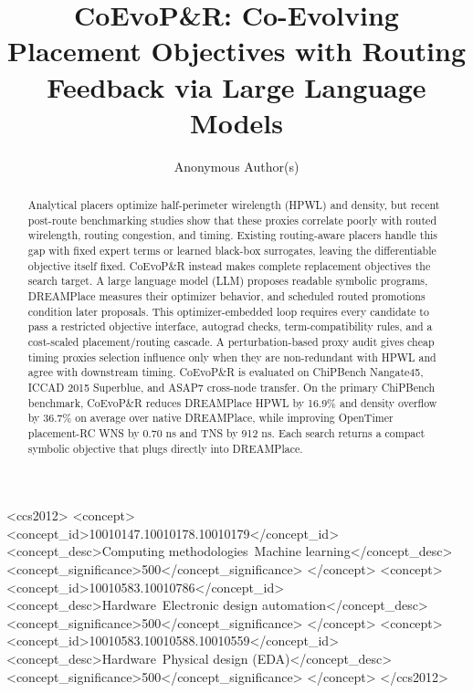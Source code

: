 \documentclass[sigconf,anonymous,review]{acmart}
\begin{document}
\title{CoEvoP\&R: Co-Evolving Placement Objectives with Routing Feedback via Large Language Models}

\author{Anonymous Author(s)}

\renewcommand{\shortauthors}{Anonymous}

\begin{abstract}
Analytical placers optimize half-perimeter wirelength (HPWL) and density, but
recent post-route benchmarking studies show that these proxies correlate poorly with
routed wirelength, routing congestion, and timing. Existing routing-aware placers
handle this gap with fixed expert terms or learned black-box surrogates, leaving
the differentiable objective itself fixed. CoEvoP\&R instead makes complete
replacement objectives the search target. A large language model (LLM)
proposes readable symbolic programs, DREAMPlace measures their optimizer
behavior, and scheduled routed promotions condition later proposals.
This optimizer-embedded loop requires every candidate to pass a restricted
objective interface, autograd checks, term-compatibility rules, and a
cost-scaled placement/routing cascade. A perturbation-based proxy audit gives
cheap timing proxies selection influence only when they are non-redundant with
HPWL and agree with downstream timing. CoEvoP\&R is evaluated on ChiPBench Nangate45, ICCAD
2015 Superblue, and ASAP7 cross-node transfer. On the primary ChiPBench
benchmark, CoEvoP\&R reduces DREAMPlace HPWL by 16.9\% and density overflow
by 36.7\% on average over native DREAMPlace, while improving OpenTimer
placement-RC WNS by 0.70 ns and TNS by 912 ns. Each search returns a compact
symbolic objective that plugs directly into DREAMPlace.
\end{abstract}

\begin{CCSXML}
<ccs2012>
<concept>
<concept_id>10010147.10010178.10010179</concept_id>
<concept_desc>Computing methodologies~Machine learning</concept_desc>
<concept_significance>500</concept_significance>
</concept>
<concept>
<concept_id>10010583.10010786</concept_id>
<concept_desc>Hardware~Electronic design automation</concept_desc>
<concept_significance>500</concept_significance>
</concept>
<concept>
<concept_id>10010583.10010588.10010559</concept_id>
<concept_desc>Hardware~Physical design (EDA)</concept_desc>
<concept_significance>500</concept_significance>
</concept>
</ccs2012>
\end{CCSXML}
\end{document}

